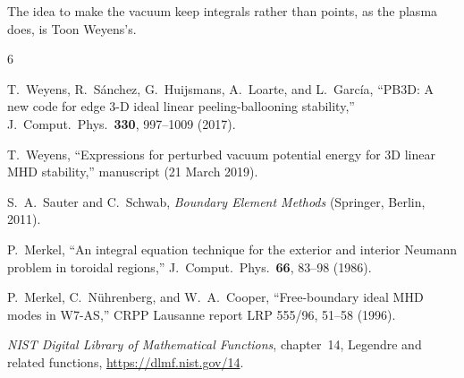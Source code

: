 \documentclass[%
 aip,
 rsi,%
 amsmath,amssymb,
 reprint,%
]{revtex4-1}
\begin{document}
\begin{acknowledgments}
The idea to make the vacuum keep integrals rather than points, as the plasma does, is Toon Weyens's.
\end{acknowledgments}

\begin{thebibliography}{6}

T.~Weyens, R.~S{\'{a}}nchez, G.~Huijsmans, A.~Loarte, and L.~Garc{\'{i}}a,
``PB3D: A new code for edge 3-D ideal linear peeling-ballooning stability,''
J.\ Comput.\ Phys.\ \textbf{330}, 997--1009 (2017).

T.~Weyens, ``Expressions for perturbed vacuum potential energy for 3D linear MHD stability,'' manuscript (21 March 2019).

S.~A.~Sauter and C.~Schwab, \emph{Boundary Element Methods} (Springer, Berlin, 2011).

P.~Merkel, ``An integral equation technique for the exterior and interior Neumann problem in toroidal regions,'' J.\ Comput.\ Phys.\ \textbf{66}, 83--98 (1986).

P.~Merkel, C.~N{\"u}hrenberg, and W.~A.~Cooper, ``Free-boundary ideal MHD modes in W7-AS,'' CRPP Lausanne report LRP 555/96, 51--58 (1996).

\emph{NIST Digital Library of Mathematical Functions}, chapter~14, Legendre and related functions, \url{https://dlmf.nist.gov/14}.

\end{thebibliography}
\end{document}
